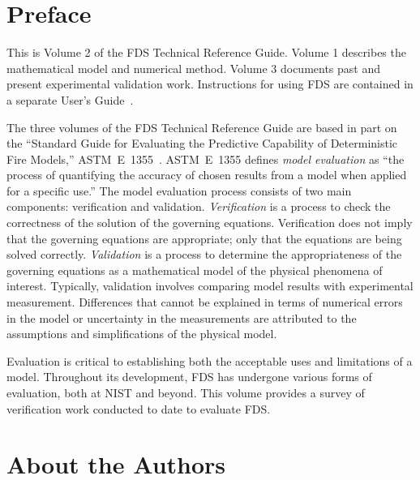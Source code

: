 \documentclass[11pt]{book}
\begin{document}
\pagestyle{plain}


\chapter{Preface}

This is Volume 2 of the FDS Technical Reference Guide. Volume 1 describes the mathematical model and
numerical method. Volume 3 documents past and present experimental validation work. Instructions for
using FDS are contained in a separate User's Guide~\cite{FDS_Users_Guide_5}.

The three volumes of the FDS Technical Reference Guide are based in part on the ``Standard Guide for
Evaluating the Predictive Capability of Deterministic Fire Models,'' ASTM~E~1355~\cite{ASTM:E1355}.
ASTM~E~1355 defines {\em model evaluation} as ``the process of quantifying
the accuracy of chosen results from a model when applied for a specific use.''
The model evaluation process consists of two main components: verification and validation.
{\em Verification} is a process to check the correctness of the solution of the
governing equations. Verification does not imply that the governing equations are
appropriate; only that the equations are being solved correctly.
{\em Validation} is a process to determine the appropriateness of the governing equations as a mathematical
model of the physical phenomena of interest. Typically, validation involves comparing
model results with experimental measurement. Differences that cannot be explained in terms of
numerical errors in the model or uncertainty in the measurements
are attributed to the assumptions and simplifications of the physical model.

Evaluation is critical to establishing both the acceptable uses
and limitations of a model. Throughout its development, FDS has undergone various forms of evaluation,
both at NIST and beyond. This volume provides a survey of verification work conducted to date to evaluate FDS.



\chapter{About the Authors}
\end{document}
